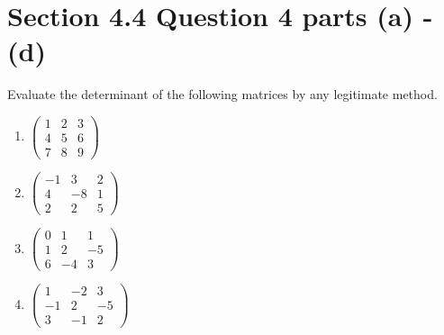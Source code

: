 \documentclass[13pt]{article}
\begin{document}
    \newpage
    \section*{Section 4.4 Question 4 parts (a) - (d)}
    Evaluate the determinant of the following matrices by any legitimate method.
    \begin{enumerate}[label=(\alph*),leftmargin=*]
    \item $
      \begin{pmatrix}
        1 & 2 & 3 \\
        4 & 5 & 6 \\
        7 & 8 & 9
      \end{pmatrix}
      $
    \item $
      \begin{pmatrix}
        -1 & 3 & 2 \\
        4 & -8 & 1 \\
        2 & 2 & 5
      \end{pmatrix}
      $
    \item $
      \begin{pmatrix}
        0 & 1 & 1 \\
        1 & 2 & -5 \\
        6 & -4 & 3
      \end{pmatrix}
      $
    \item $
      \begin{pmatrix}
        1 & -2 & 3 \\
        -1 & 2 & -5 \\
        3 & -1 & 2
      \end{pmatrix}
      $
    \end{enumerate}
\end{document}
